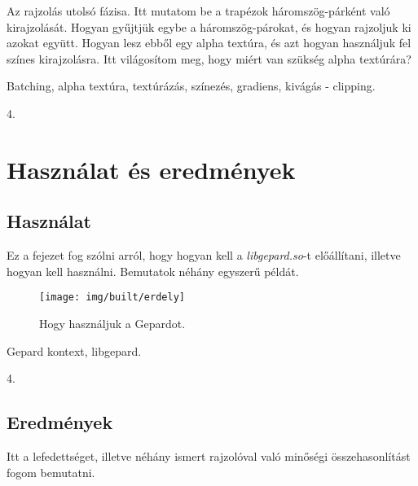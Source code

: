 \documentclass[12pt]{report}
\theoremstyle{definition}
\begin{document}
Az rajzolás utolsó fázisa. Itt mutatom be a trapézok
háromszög-párként való kirajzolását. Hogyan gyűjtjük egybe a
háromszög-párokat, és hogyan rajzoljuk ki azokat együtt. Hogyan lesz
ebből egy alpha textúra, és azt hogyan használjuk fel színes
kirajzolásra. Itt világosítom meg, hogy miért van szükség alpha textúrára?

  \begin{description}[noitemsep]
    \item[Kulcsszavak] Batching, alpha textúra, textúrázás, színezés,
    gradiens, kivágás - clipping.
    \item[Becsült oldalszám] 4.
  \end{description}



    \chapter{Használat és eredmények}

    \section{Használat}

  Ez a fejezet fog szólni arról, hogy hogyan kell a \emph{libgepard.so}-t
előállítani, illetve hogyan kell használni. Bemutatok néhány egyszerű
példát.

  \begin{figure}[!htb]
    \centering
    \texttt{[image: img/built/erdely]}
    \caption{\label{erdely} Hogy használjuk a Gepardot.}
  \end{figure}

  \begin{description}[noitemsep]
    \item[Kulcsszavak] Gepard kontext, libgepard.
    \item[Becsült oldalszám] 4.
  \end{description}

    \section{Eredmények}
    \label{Eredmények}

  Itt a lefedettséget, illetve néhány ismert rajzolóval való minőségi
összehasonlítást fogom bemutatni.
\end{document}
